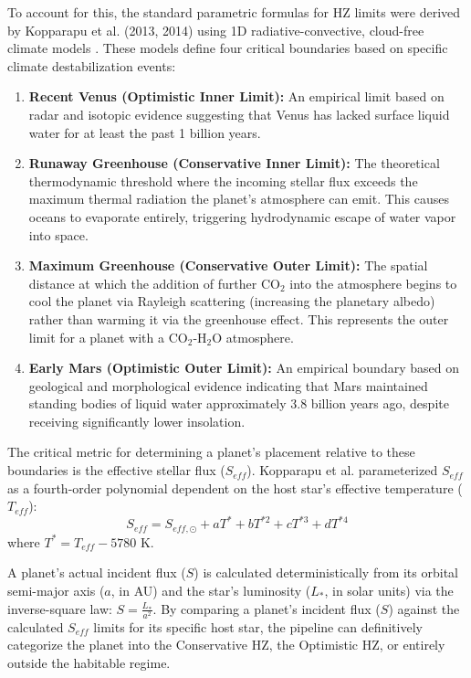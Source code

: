 To account for this, the standard parametric formulas for HZ limits were derived by Kopparapu et al. (2013, 2014) using 1D radiative-convective, cloud-free climate models \cite{HabitableZonesMainSequence}. These models define four critical boundaries based on specific climate destabilization events:
\begin{enumerate}
    \item \textbf{Recent Venus (Optimistic Inner Limit):} An empirical limit based on radar and isotopic evidence suggesting that Venus has lacked surface liquid water for at least the past 1 billion years.
    \item \textbf{Runaway Greenhouse (Conservative Inner Limit):} The theoretical thermodynamic threshold where the incoming stellar flux exceeds the maximum thermal radiation the planet's atmosphere can emit. This causes oceans to evaporate entirely, triggering hydrodynamic escape of water vapor into space.
    \item \textbf{Maximum Greenhouse (Conservative Outer Limit):} The spatial distance at which the addition of further CO$_2$ into the atmosphere begins to cool the planet via Rayleigh scattering (increasing the planetary albedo) rather than warming it via the greenhouse effect. This represents the outer limit for a planet with a CO$_2$-H$_2$O atmosphere.
    \item \textbf{Early Mars (Optimistic Outer Limit):} An empirical boundary based on geological and morphological evidence indicating that Mars maintained standing bodies of liquid water approximately 3.8 billion years ago, despite receiving significantly lower insolation.
\end{enumerate}

The critical metric for determining a planet's placement relative to these boundaries is the effective stellar flux ($S_{eff}$). Kopparapu et al. parameterized $S_{eff}$ as a fourth-order polynomial dependent on the host star's effective temperature ($T_{eff}$):
\begin{equation}
S_{eff} = S_{eff,\odot} + aT^* + bT^{*2} + cT^{*3} + dT^{*4}
\end{equation}
where $T^* = T_{eff} - 5780$ K. 

A planet's actual incident flux ($S$) is calculated deterministically from its orbital semi-major axis ($a$, in AU) and the star's luminosity ($L_*$, in solar units) via the inverse-square law: $S = \frac{L_*}{a^2}$. By comparing a planet's incident flux ($S$) against the calculated $S_{eff}$ limits for its specific host star, the pipeline can definitively categorize the planet into the Conservative HZ, the Optimistic HZ, or entirely outside the habitable regime.


